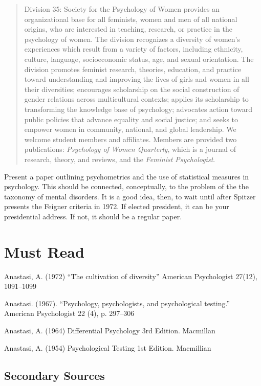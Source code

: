 \begin{quote}

Division 35: Society for the Psychology of Women provides an organizational base for all feminists, women and men of all national origins, who are interested in teaching, research, or practice in the psychology of women. The division recognizes a diversity of women's experiences which result from a variety of factors, including ethnicity, culture, language, socioeconomic status, age, and sexual orientation. The division promotes feminist research, theories, education, and practice toward understanding and improving the lives of girls and women in all their diversities; encourages scholarship on the social construction of gender relations across multicultural contexts; applies its scholarship to transforming the knowledge base of psychology; advocates action toward public policies that advance equality and social justice; and seeks to empower women in community, national, and global leadership. We welcome student members and affiliates. Members are provided two publications: \emph{Psychology of Women Quarterly}, which is a journal of research, theory, and reviews, and the \emph{Feminist Psychologist}.
\end{quote}

Present a paper outlining psychometrics and the use of statistical measures in psychology. This should be connected, conceptually, to the problem of the the taxonomy of mental disorders. It is a good idea, then, to wait until after Spitzer presents the Feigner criteria in 1972. If elected president, it can be your presidential address. If not, it should be a regular paper.

\section{Must Read}
\label{mustread}

Anastasi, A. (1972) ``The cultivation of diversity'' American Psychologist 27(12), 1091--1099

Anastasi. (1967). ``Psychology, psychologists, and psychological testing.'' American Psychologist 22 (4), p. 297--306

Anastasi, A. (1964) Differential Psychology 3rd Edition. Macmillan

Anastasi, A. (1954) Psychological Testing 1st Edition. Macmillian

\subsection{Secondary Sources}
\label{secondarysources}

